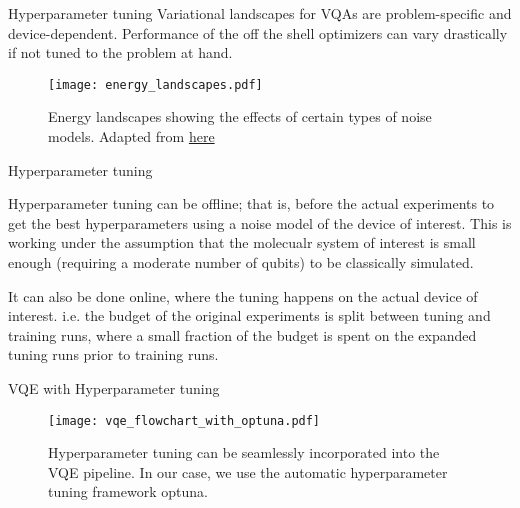 \begin{frame}{Hyperparameter tuning}
    Variational landscapes for VQAs are problem-specific and device-dependent.
    Performance of the off the shell optimizers can vary drastically if not
    tuned to the problem at hand.

    \begin{figure}
      \centering
      \texttt{[image: energy\_landscapes.pdf]}
      \caption{
        Energy landscapes showing the effects of certain types of noise models.
        Adapted from \href{https://quantum-journal.org/papers/q-2024-03-14-1287/pdf}{here}
      }
    \end{figure}

\end{frame}

\begin{frame}{Hyperparameter tuning}

    Hyperparameter tuning can be {\color{red}offline}; that is, before the actual
    experiments to get the best hyperparameters using a noise model of the device
    of interest. This is working under the assumption that the molecualr system of interest
    is small enough (requiring a moderate number of qubits) to be classically simulated.

    \vspace{2ex}

    It can also be done {\color{red}online}, where the tuning happens on the actual device of
    interest. i.e. the budget of the original experiments is split between
    tuning and training runs, where a small fraction of the budget is spent
    on the expanded tuning runs prior to training runs.


\end{frame}

\begin{frame}{VQE with Hyperparameter tuning}
    \begin{figure}
      \centering
      \texttt{[image: vqe\_flowchart\_with\_optuna.pdf]}
      \caption{
        Hyperparameter tuning can be seamlessly incorporated into the VQE pipeline.
        In our case, we use the automatic hyperparameter tuning framework optuna.
      }
    \end{figure}
\end{frame}


